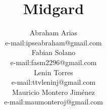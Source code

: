 \documentclass[twocolumn]{IEEEtran}
\begin{document}
\title{Midgard}







 


\author{Abraham Arias\\
        e-mail:ipseabraham@gmail.com\\
        Fabian Solano\\
        e-mail:fasm2296@gmail.com\\
        Lenin Torres\\
        e-mail:ttvleninj@gmail.com\\
        Mauricio Montero Jiménez\\
        e-mail:maumonteroj@gmail.com\\
}
\end{document}
